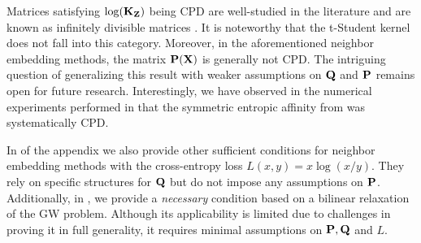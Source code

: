 Matrices satisfying $\log({\mathbf{K}}_{\mathbf{Z}})$ being CPD are well-studied in the literature
and are known as infinitely divisible matrices \citep{bhatia2006infinitely}. It
is noteworthy that the t-Student kernel does not fall into this category.
Moreover,  in the aforementioned neighbor embedding methods, the matrix
${\mathbf{P}}({\mathbf{X}})$ is generally not CPD. The intriguing question of generalizing this
result with weaker assumptions on ${\mathbf{Q}}$ and ${\mathbf{P}}$ remains open for future
research. Interestingly, we have observed in the numerical experiments performed in  that the
symmetric entropic affinity from  was systematically CPD. 

\begin{remark}
In  of the appendix we also provide other sufficient conditions for neighbor embedding methods with the cross-entropy loss $L(x,y) = x \log(x/y)$. They rely on specific structures for ${\mathbf{Q}}$ but do not impose any assumptions on ${\mathbf{P}}$. Additionally, in , we provide a \emph{necessary} condition based on a bilinear relaxation of the GW problem. Although its applicability is limited due to challenges in proving it in full generality, it requires minimal assumptions on ${\mathbf{P}}, {\mathbf{Q}}$ and $L$.
\end{remark} 








